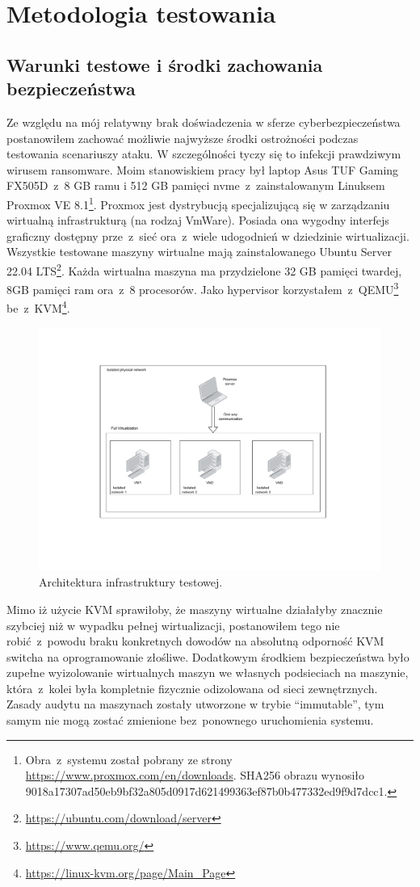 \section{Metodologia testowania}
\subsection{Warunki testowe i środki zachowania bezpieczeństwa}
Ze względu na mój relatywny brak doświadczenia w sferze cyberbezpieczeństwa postanowiłem 
zachować możliwie najwyższe środki ostrożności podczas testowania scenariuszy ataku. W szczególności tyczy się to infekcji prawdziwym wirusem ransomware.\newline
Moim stanowiskiem pracy był laptop Asus TUF Gaming FX505D~z~8 GB ramu i 512 GB pamięci nvme~z~zainstalowanym Linuksem Proxmox VE 8.1\footnote{Obra~z~systemu został pobrany ze strony \url{https://www.proxmox.com/en/downloads}. SHA256 obrazu wynosiło 9018a17307ad50eb9bf32a805d0917d621499363ef87b0b477332ed9f9d7dcc1.}. Proxmox jest dystrybucją specjalizującą się w zarządzaniu wirtualną infrastrukturą (na rodzaj VmWare). Posiada ona wygodny interfejs graficzny dostępny prze~z~sieć ora~z~wiele udogodnień w dziedzinie wirtualizacji.
\newline
Wszystkie testowane maszyny wirtualne mają zainstalowanego Ubuntu Server 22.04 LTS\footnote{\url{https://ubuntu.com/download/server}}. Każda wirtualna maszyna ma przydzielone 32 GB pamięci twardej, 8GB pamięci ram ora~z~8 procesorów. Jako hypervisor korzystałem~z~QEMU\footnote{\url{https://www.qemu.org/}} be~z~KVM\footnote{\url{https://linux-kvm.org/page/Main_Page}}.
\begin{figure}[H]
    \centering
    \includegraphics[width=0.45\linewidth]{rysunki/test.drawio.pdf}
    \caption{Architektura infrastruktury testowej.}
    \label{fig:enter-label}
\end{figure}
Mimo iż użycie KVM sprawiłoby, że maszyny wirtualne działałyby znacznie szybciej niż w wypadku pełnej wirtualizacji, postanowiłem tego nie robić~z~powodu braku konkretnych dowodów na absolutną odporność KVM switcha na oprogramowanie złośliwe. Dodatkowym środkiem bezpieczeństwa było zupełne wyizolowanie wirtualnych maszyn we własnych podsieciach na maszynie, która~z~kolei była kompletnie fizycznie odizolowana od sieci zewnętrznych. Zasady audytu na maszynach zostały utworzone w trybie \foreignquote{english}{immutable}, tym samym nie mogą zostać zmienione bez~ponownego uruchomienia systemu.

